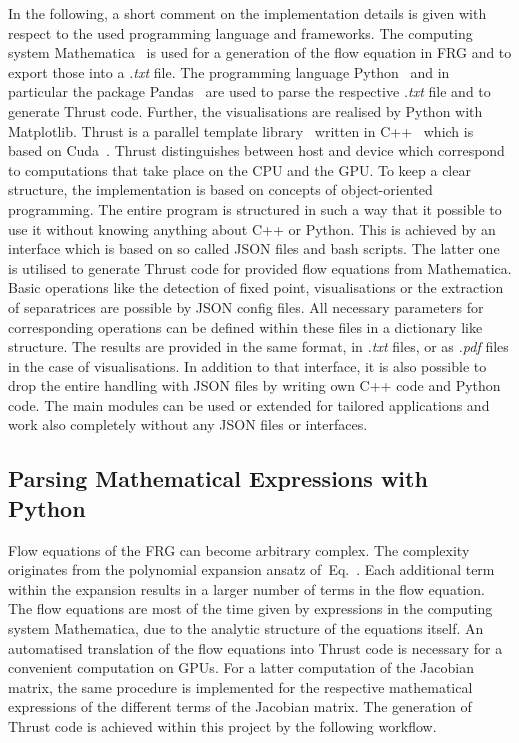 \documentclass[paper=a4,11pt,bibliography=totoc]{scrartcl}
\def\eq#1{\textcolor{red!50!black}{Eq.}~\labelcref{#1}}
\begin{document}
In the following, a short comment on the implementation details is given with respect to the used programming language and frameworks. The computing system Mathematica~\cite{Mathematica} is used for a generation of the flow equation in FRG and to export those into a \textit{.txt} file. The programming language Python~\cite{Rossum1995} and in particular the package Pandas~\cite{Pandas} are used to parse the respective \textit{.txt} file and to generate Thrust code. Further, the visualisations are realised by Python with Matplotlib. Thrust is a parallel template library~\cite{Thrust} written in C++~\cite{CPlusPlus} which is based on Cuda~\cite{Bell}. Thrust distinguishes between host and device which correspond to computations that take place on the CPU and the GPU. To keep a clear structure, the implementation is based on concepts of object-oriented programming. The entire program is structured in such a way that it possible to use it without knowing anything about C++ or Python. This is achieved by an interface which is based on so called JSON files and bash scripts. The latter one is utilised to generate Thrust code for provided flow equations from Mathematica. Basic operations like the detection of fixed point, visualisations or the extraction of separatrices are possible by JSON config files. All necessary parameters for corresponding operations can be defined within these files in a dictionary like structure. The results are provided in the same format, in \textit{.txt} files, or as \textit{.pdf} files in the case of visualisations. In addition to that interface, it is also possible to drop the entire handling with JSON files by writing own C++ code and Python code. The main modules can be used or extended for tailored applications and work also completely without any JSON files or interfaces.

\subsection{Parsing Mathematical Expressions with Python}

Flow equations of the FRG can become arbitrary complex. The complexity originates from the polynomial expansion ansatz of~\eq{eq:polyexpansion}. Each additional term within the expansion results in a larger number of terms in the flow equation. The flow equations are most of the time given by expressions in the computing system Mathematica, due to the analytic structure of the equations itself. An automatised translation of the flow equations into Thrust code is necessary for a convenient computation on GPUs. For a latter computation of the Jacobian matrix, the same procedure is implemented for the respective mathematical expressions of the different terms of the Jacobian matrix.
The generation of Thrust code is achieved within this project by the following workflow.
\end{document}
